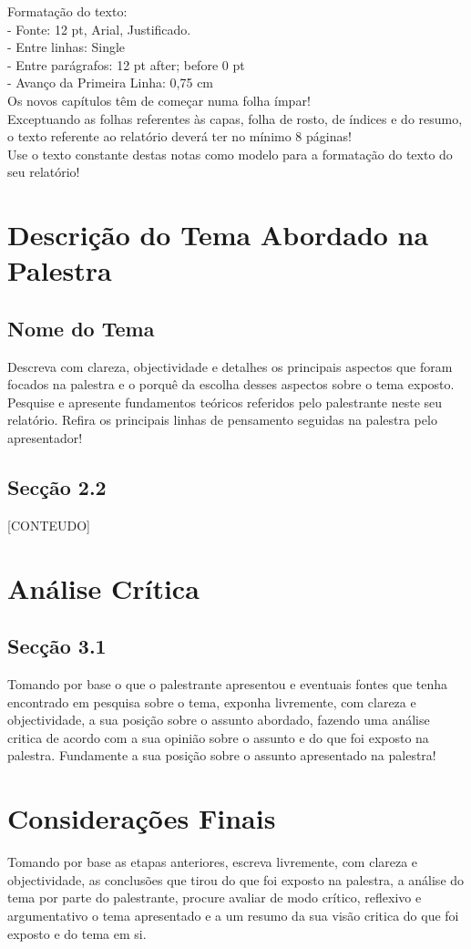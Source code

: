 \documentclass[a4paper,10pt]{report}
\newcommand{\chapterf}[1]{\chapter{#1}\thispagestyle{fancy}}
\begin{document}
Formatação do texto:\\
- Fonte: 12 pt, Arial, Justificado.\\
- Entre linhas: Single\\
- Entre parágrafos: 12 pt after; before 0 pt\\
- Avanço da Primeira Linha: 0,75 cm\\


Os novos capítulos têm de começar numa folha ímpar!\\
Exceptuando as folhas referentes às capas, folha de rosto, de índices e do resumo, o texto referente ao relatório deverá ter no mínimo 8 páginas!\\
Use o texto constante destas notas como modelo para a formatação do texto do seu relatório!\\

\chapterf{Descrição do Tema Abordado na Palestra}

\section{Nome do Tema}

Descreva com clareza, objectividade e detalhes os principais aspectos que foram focados na palestra e o porquê da escolha desses aspectos sobre o tema exposto. 
Pesquise e apresente fundamentos teóricos referidos pelo palestrante neste seu relatório.
Refira os principais linhas de pensamento seguidas na palestra pelo apresentador!


\section{Secção 2.2}
[CONTEUDO]
\newpage

\chapterf{Análise Crítica}

\section{Secção 3.1}

Tomando por base o que o palestrante apresentou e eventuais fontes que tenha encontrado em pesquisa sobre o tema, exponha livremente, com clareza e objectividade, a sua posição sobre o assunto abordado, fazendo uma análise critica de acordo com a sua opinião sobre o assunto e do que foi exposto na palestra. 
Fundamente a sua posição sobre o assunto apresentado na palestra! 

\chapterf{Considerações Finais}
Tomando por base as etapas anteriores, escreva livremente, com clareza e objectividade, as conclusões que tirou do que foi exposto na palestra, a análise do tema por parte do palestrante, procure avaliar de modo crítico, reflexivo e argumentativo o tema apresentado e a um resumo da sua visão critica do que foi exposto e do tema em si.
\end{document}
